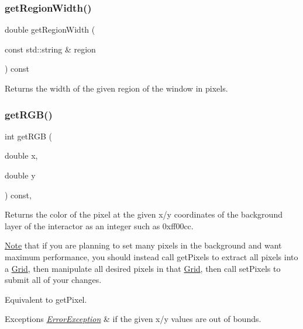 \subsubsection{\texorpdfstring{get\+Region\+Width()}{getRegionWidth()}\hspace{0.1cm}{\footnotesize\ttfamily [2/2]}}
{\footnotesize\ttfamily double get\+Region\+Width (\begin{DoxyParamCaption}\item[{const std\+::string \&}]{region }\end{DoxyParamCaption}) const\hspace{0.3cm}{\ttfamily [virtual]}}



Returns the width of the given region of the window in pixels. 

\mbox{\label{classGDrawingSurface_a9e983467cf0c97cfd62433a8471570dc}} 
\subsubsection{\texorpdfstring{get\+R\+G\+B()}{getRGB()}}
{\footnotesize\ttfamily int get\+R\+GB (\begin{DoxyParamCaption}\item[{double}]{x,  }\item[{double}]{y }\end{DoxyParamCaption}) const\hspace{0.3cm}{\ttfamily [virtual]}, {\ttfamily [inherited]}}



Returns the color of the pixel at the given x/y coordinates of the background layer of the interactor as an integer such as 0xff00cc. 

\mbox{\hyperlink{classNote}{Note}} that if you are planning to set many pixels in the background and want maximum performance, you should instead call get\+Pixels to extract all pixels into a \mbox{\hyperlink{classGrid}{Grid}}, then manipulate all desired pixels in that \mbox{\hyperlink{classGrid}{Grid}}, then call set\+Pixels to submit all of your changes.

Equivalent to get\+Pixel.


\begin{DoxyExceptions}{Exceptions}
{\em \mbox{\hyperlink{classErrorException}{Error\+Exception}}} & if the given x/y values are out of bounds. \\
\hline
\end{DoxyExceptions}
\mbox{\label{classGDrawingSurface_a456d3582acc3544f37d939f5cb8802fe}} 
